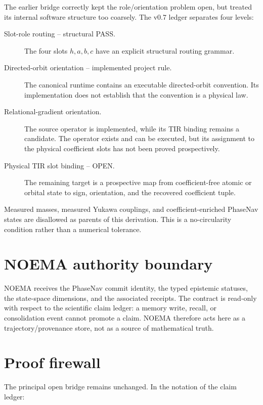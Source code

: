 The earlier bridge correctly kept the role/orientation problem open, but treated
its internal software structure too coarsely.  The v0.7 ledger separates four
levels:

\begin{description}
  \item[Slot-role routing -- structural PASS.]
  The four slots $h,a,b,c$ have an explicit structural routing grammar.

  \item[Directed-orbit orientation -- implemented project rule.]
  The canonical runtime contains an executable directed-orbit convention.  Its
  implementation does not establish that the convention is a physical law.

  \item[Relational-gradient orientation.]
  The source operator is implemented, while its TIR binding remains a candidate.
  The operator exists and can be executed, but its assignment to the physical
  coefficient slots has not been proved prospectively.

  \item[Physical TIR slot binding -- OPEN.]
  The remaining target is a prospective map from coefficient-free atomic or
  orbital state to sign, orientation, and the recovered coefficient tuple.
\end{description}

Measured masses, measured Yukawa couplings, and coefficient-enriched PhaseNav
states are disallowed as parents of this derivation.  This is a no-circularity
condition rather than a numerical tolerance.

\section{NOEMA authority boundary}

NOEMA receives the PhaseNav commit identity, the typed epistemic statuses, the
state-space dimensions, and the associated receipts.  The contract is
read-only with respect to the scientific claim ledger: a memory write, recall,
or consolidation event cannot promote a claim.  NOEMA therefore acts here as a
trajectory/provenance store, not as a source of mathematical truth.

\section{Proof firewall}

The principal open bridge remains unchanged.  In the notation of the claim
ledger:

